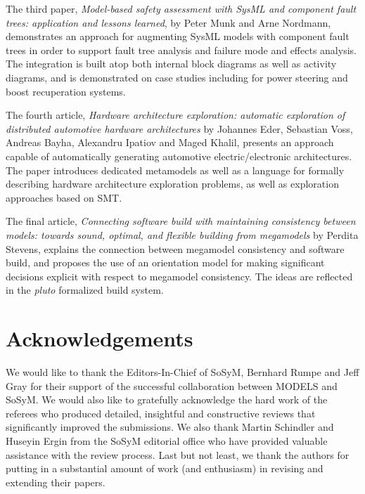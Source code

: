 \documentclass{svjour3}                     %
\begin{document}
The third paper, \textit{Model-based safety assessment with SysML and component fault trees: application and lessons learned}, by Peter Munk and
Arne Nordmann, demonstrates an approach for augmenting SysML models with component fault trees in order to support
fault tree analysis and failure mode and effects analysis. The integration is built atop both internal block diagrams as well as activity
diagrams, and is demonstrated on case studies including for power steering and boost recuperation systems.

The fourth article, \textit{Hardware architecture exploration: automatic exploration of distributed automotive hardware
architectures} by Johannes Eder, Sebastian Voss, Andreas Bayha, Alexandru Ipatiov and Maged Khalil, presents an approach capable of 
automatically generating automotive electric/electronic architectures. The paper introduces dedicated metamodels as well as a language for formally
describing hardware architecture exploration problems, as well as exploration approaches based on SMT. 

The final article, \textit{Connecting software build with maintaining consistency between models: towards sound, optimal, and flexible building from megamodels}
by Perdita Stevens, explains the connection between megamodel consistency and software build, and proposes the use of an orientation model for making
significant decisions explicit with respect to megamodel consistency. The ideas are reflected in the \textit{pluto} formalized build system.

\section*{Acknowledgements}
We would like to thank the Editors-In-Chief of SoSyM, Bernhard Rumpe and Jeff Gray for their support of the successful collaboration between MODELS and SoSyM. 
We would also like to gratefully acknowledge the hard work of the referees who produced detailed, insightful and constructive reviews that significantly improved the
submissions. We also thank Martin Schindler and Huseyin Ergin from the SoSyM editorial office who have provided valuable assistance with the review process. Last but not least, we thank the authors for putting in a substantial amount of work (and enthusiasm) in revising and extending their papers.
\end{document}
